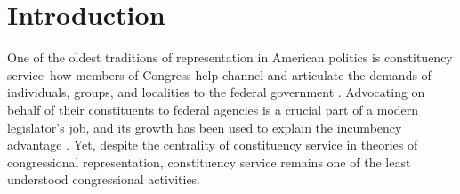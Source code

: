 \documentclass[12pt]{article}
\begin{document}

\doublespacing
\clearpage




\section{Introduction}

One of the oldest traditions of representation in American politics is constituency service--how members of Congress help channel and articulate the demands of individuals, groups, and localities to the federal government \citep{Fenno1978}. Advocating on behalf of their constituents to federal agencies is a crucial part of a modern legislator's job, and its growth has been used to explain the incumbency advantage \citep{King1991}. Yet, despite the centrality of constituency service in theories of congressional representation, constituency service remains one of the least understood congressional activities.%
\end{document}
